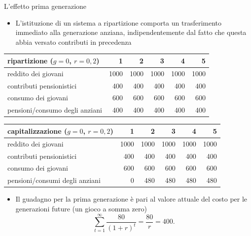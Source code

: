 \documentclass[aspectratio=64,12pt]{beamer}
\begin{document}
\begin{frame}{L'effetto prima generazione}
\begin{resize}{.9}
\begin{itemize}
\item L'istituzione di un sistema a ripartizione comporta un trasferimento
immediato alla generazione anziana, indipendentemente dal fatto che questa
abbia versato contributi in precedenza
\end{itemize}
\begin{center}
\footnotesize
\begin{center}
\begin{tabular}{lrrrrr}
\hline
ripartizione ($g=0$, $r=0,2$) & 1 & 2 & 3 & 4 & 5\\[0pt]
\hline
reddito dei giovani & 1000 & 1000 & 1000 & 1000 & 1000\\[0pt]
contributi pensionistici & 400 & 400 & 400 & 400 & 400\\[0pt]
consumo dei giovani & 600 & 600 & 600 & 600 & 600\\[0pt]
pensioni/consumo degli anziani & 400 & 400 & 400 & 400 & 400\\[0pt]
\hline
\end{tabular}
\end{center}
\end{center}

\begin{center}
\footnotesize
\begin{center}
\begin{tabular}{lrrrrr}
\hline
capitalizzazione ($g=0$, $r=0,2$) & 1 & 2 & 3 & 4 & 5\\[0pt]
\hline
reddito dei giovani & 1000 & 1000 & 1000 & 1000 & 1000\\[0pt]
contributi pensionistici & 400 & 400 & 400 & 400 & 400\\[0pt]
consumo dei giovani & 600 & 600 & 600 & 600 & 600\\[0pt]
pensioni/consumi degli anziani & 0 & 480 & 480 & 480 & 480\\[0pt]
\hline
\end{tabular}
\end{center}
\end{center}

\begin{itemize}
\item Il guadagno per la prima generazione è pari al valore attuale del costo per le
generazioni future (un gioco a somma zero)
\begin{equation*}
\sum_{t=1}^{\infty}\frac{80}{(1+r)^{t}}=\frac{80}{r}=400.
\end{equation*}
\end{itemize}
\end{resize}
\end{frame}
\end{document}
